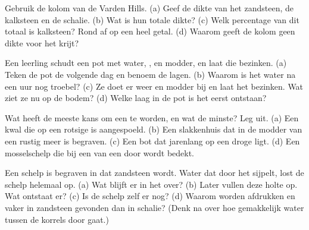 \begin{exercise}[$\star\star$]\label{exo:g7:sediments-and-fossils:5}
Gebruik de kolom van de Varden Hills. (a) Geef de dikte van het zandsteen,
de kalksteen en de schalie. (b) Wat is hun totale dikte? (c) Welk
percentage van dit totaal is kalksteen? Rond af op een heel getal.
(d) Waarom geeft de kolom geen dikte voor het krijt?
\end{exercise}

\begin{exercise}[$\star\star$]\label{exo:g7:sediments-and-fossils:6}
Een leerling schudt een pot met water, ,  en modder, en laat die
bezinken. (a) Teken de pot de volgende dag en benoem de lagen. (b) Waarom is
het water na een uur nog troebel? (c) Ze doet er weer  en modder bij en
laat het bezinken. Wat ziet ze nu op de bodem? (d) Welke laag in de pot is
het eerst ontstaan?
\end{exercise}

\begin{exercise}[$\star\star$]\label{exo:g7:sediments-and-fossils:7}
Wat heeft de meeste kans om een  te worden, en wat de minste? Leg
uit. (a) Een kwal die op een rotsige  is aangespoeld. (b) Een
slakkenhuis dat in de modder van een rustig meer is begraven. (c) Een bot
dat jarenlang op een droge  ligt. (d) Een mosselschelp die bij een
 van een  door  wordt bedekt.
\end{exercise}

\begin{exercise}[$\star\star$]\label{exo:g7:sediments-and-fossils:8}
Een schelp is begraven in  dat zandsteen wordt. Water dat door het
 sijpelt, lost de schelp helemaal op. (a) Wat blijft er in het
 over? (b) Later vullen  deze holte op. Wat ontstaat er?
(c) Is de schelp zelf er nog? (d) Waarom worden afdrukken en 
vaker in zandsteen gevonden dan in schalie? (Denk na over hoe gemakkelijk
water tussen de korrels door gaat.)
\end{exercise}


